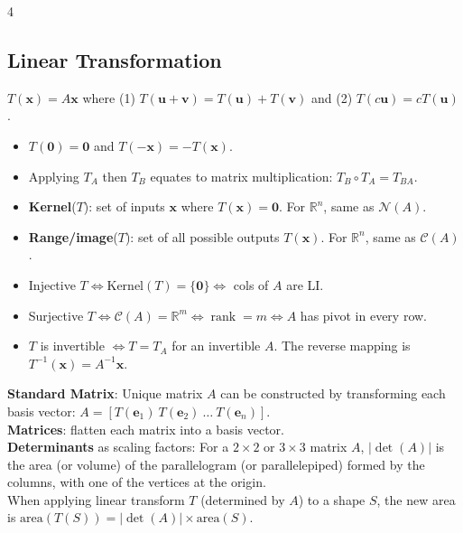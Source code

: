 \documentclass[9pt]{extarticle}
\begin{document}
\begin{multicols*}{4}
\subsection*{Linear Transformation}
$T(\mathbf{x})=A\mathbf{x}$ where (1) $T(\mathbf{u}+\mathbf{v})=T(\mathbf{u})+T(\mathbf{v})$ and (2) $T(c\mathbf{u})=cT(\mathbf{u})$.\\
\begin{itemize}
    \item $T(\mathbf{0})=\mathbf{0}$ and $T(-\mathbf{x})=-T(\mathbf{x})$.
    \item Applying $T_A$ then $T_B$ equates to matrix multiplication: $T_B \circ T_A = T_{BA}$.
    \item \textbf{Kernel}($T$): set of inputs $\mathbf{x}$ where $T(\mathbf{x})=\mathbf{0}$. For $\mathbb{R}^n$, same as $\mathcal{N}(A)$.
    \item \textbf{Range/image}($T$): set of all possible outputs $T(\mathbf{x})$. For $\mathbb{R}^n$, same as $\mathcal{C}(A)$.
    \item Injective $T \Leftrightarrow \text{Kernel}(T)=\{\mathbf{0}\} \Leftrightarrow$ cols of $A$ are LI.
    \item Surjective $T \Leftrightarrow \mathcal{C}(A)=\mathbb{R}^m \Leftrightarrow \operatorname{rank} = m \Leftrightarrow A$ has pivot in every row.
    \item $T$ is invertible $\Leftrightarrow T = T_A$ for an invertible $A$. The reverse mapping is $T^{-1}(\mathbf{x})=A^{-1}\mathbf{x}$.
\end{itemize}
\textbf{Standard Matrix}: Unique matrix $A$ can be constructed by transforming each basis vector: $A=[T(\mathbf{e}_{1})\ T(\mathbf{e}_{2})\ \dots\ T(\mathbf{e}_{n})]$.\\

\textbf{Matrices}: flatten each matrix into a basis vector.\\
\textbf{Determinants} as scaling factors: For a $2\times 2$ or $3\times 3$ matrix $A$, $|\det(A)|$ is the area (or volume) of the parallelogram (or parallelepiped) formed by the columns, with one of the vertices at the origin.\\
When applying linear transform $T$ (determined by $A$) to a shape $S$, the new area is $\text{area}(T(S))=|\det(A)|\times \text{area}(S)$.\\


\end{multicols*}
\end{document}
